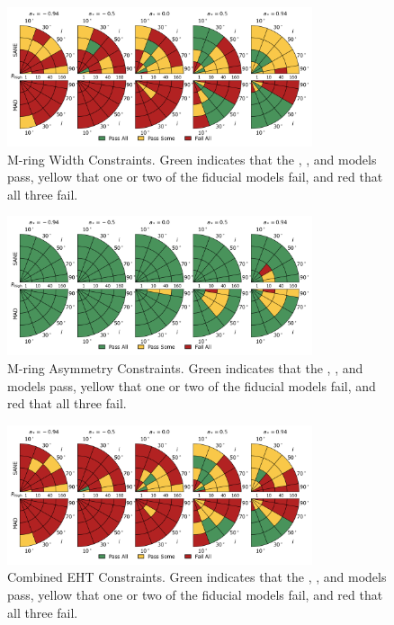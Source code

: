\begin{figure}
  \centering
  \includegraphics[width=0.8\textwidth]{./figures/Mring_w_Constraints.png}
  \caption{M-ring Width Constraints.  Green indicates that the \kharma, \bhac, and \hamr models pass, yellow that one or two of the fiducial models fail, and red that all three fail.}
  \label{fig:mring_width_pizza}
\end{figure}
\begin{figure}
  \centering
  \includegraphics[width=0.8\textwidth]{./figures/Mring_f1_Constraints.png}
  \caption{M-ring Asymmetry Constraints.  Green indicates that the \kharma, \bhac, and \hamr models pass, yellow that one or two of the fiducial models fail, and red that all three fail.}
  \label{fig:mring_asymm_pizza}
\end{figure}
\begin{figure}
  \centering
  \includegraphics[width=0.8\textwidth]{./figures/Interferometric_Constraints.png}
  \caption{Combined EHT Constraints.  Green indicates that the \kharma, \bhac, and \hamr models pass, yellow that one or two of the fiducial models fail, and red that all three fail.}
  \label{fig:eht_comb_pizza}
\end{figure}

